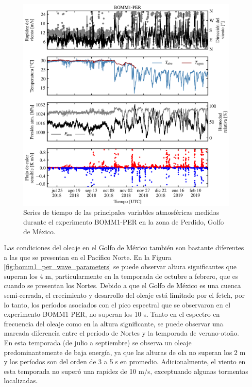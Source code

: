 \documentclass[11pt]{article}
\begin{document}
\begin{figure}[htpb]
  \centering
  \includegraphics[width=0.85\linewidth]{../figures/bomm1_per_main_variables.png}
  \caption{
    Series de tiempo de las principales variables atmosféricas medidas durante
    el experimento BOMM1-PER en la zona de Perdido, Golfo de México.
  }
  \label{fig:bomm1_per_main_variables}
\end{figure}

Las condiciones del oleaje en el Golfo de México también son bastante diferentes
a las que se presentan en el Pacífico Norte. En la Figura
\ref{fig:bomm1_per_wave_parameters} se puede observar altura significantes que
superan los 4 m, particularmente en la temporada de octubre a febrero, que es
cuando se presentan los Nortes. Debido a que el Golfo de México es una cuenca
semi-cerrada, el crecimiento y desarrollo del oleaje está limitado por el fetch,
por lo tanto, los períodos asociados con el pico espectral que se observaron en
el experimento BOMM1-PER, no superan los 10 s. Tanto en el espectro en
frecuencia del oleaje como en la altura significante, se puede observar una
marcada diferencia entre el período de Nortes y la temporada de verano-otoño. En
esta temporada (de julio a septiembre) se observa un oleaje predominantemente de
baja energía, ya que las alturas de ola no superan los 2 m y los períodos son
del orden de 3 a 5 s en promedio. Adicionalmente, el viento en esta temporada no
superó una rapidez de 10 m/s, exceptuando algunas tormentas localizadas.
\end{document}
